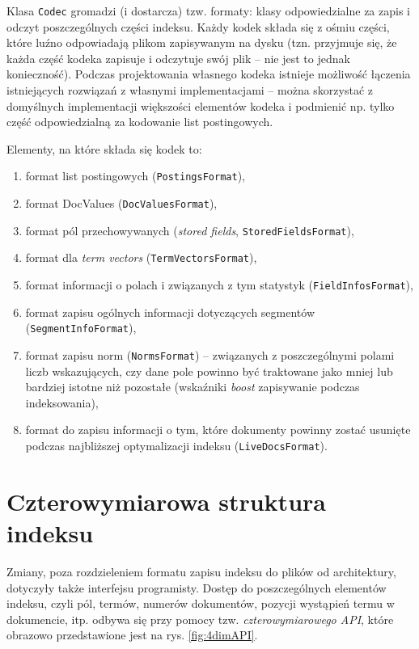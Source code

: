 Klasa \texttt{Codec} gromadzi (i dostarcza) tzw. formaty: klasy odpowiedzialne za zapis i odczyt poszczególnych części indeksu. Każdy kodek składa się z ośmiu części, które luźno odpowiadają plikom zapisywanym na dysku (tzn. przyjmuje się, że każda część kodeka zapisuje i odczytuje swój plik -- nie jest to jednak konieczność). Podczas projektowania własnego kodeka istnieje możliwość łączenia istniejących rozwiązań z własnymi implementacjami -- można skorzystać z domyślnych implementacji większości elementów kodeka i podmienić np. tylko część odpowiedzialną za kodowanie list postingowych.

Elementy, na które składa się kodek to:
\begin{enumerate}
 \item format list postingowych (\texttt{PostingsFormat}),
 \item format DocValues (\texttt{DocValuesFormat}),
 \item format pól przechowywanych (\emph{stored fields}, \texttt{StoredFieldsFormat}),
 \item format dla \emph{term vectors} (\texttt{TermVectorsFormat}),
 \item format informacji o polach i związanych z tym statystyk (\texttt{FieldInfosFormat}),
 \item format zapisu ogólnych informacji dotyczących segmentów (\texttt{SegmentInfoFormat}),
 \item format zapisu norm (\texttt{NormsFormat}) -- związanych z poszczególnymi polami liczb wskazujących, czy dane pole powinno być traktowane jako mniej lub bardziej istotne niż pozostałe (wskaźniki \emph{boost} zapisywanie podczas indeksowania),
 \item format do zapisu informacji o tym, które dokumenty powinny zostać usunięte podczas najbliższej optymalizacji indeksu (\texttt{LiveDocsFormat}).
\end{enumerate}

\section{Czterowymiarowa struktura indeksu}

Zmiany, poza rozdzieleniem formatu zapisu indeksu do plików od architektury, dotyczyły także interfejsu programisty. Dostęp do poszczególnych elementów indeksu, czyli pól, termów, numerów dokumentów, pozycji wystąpień termu w dokumencie, itp. odbywa się przy pomocy tzw. \emph{czterowymiarowego API}, które obrazowo przedstawione jest na rys. \ref{fig:4dimAPI}.

